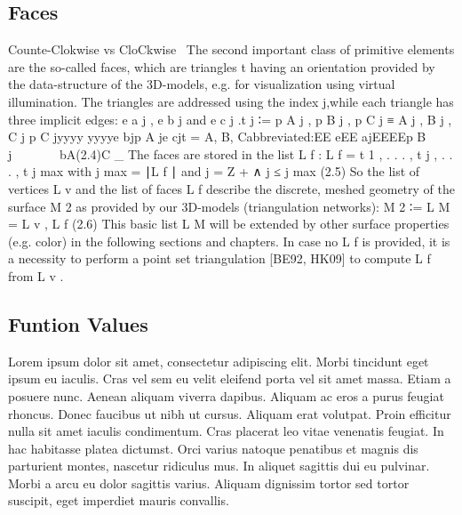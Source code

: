 \documentclass[openany]{book}
\begin{document}
\subsection{Faces}
Counte-Clokwise vs CloCkwise~\cite[p.~00]{SourceNeeded}
The second important class of primitive elements are the so-called faces, which 
are triangles t having an orientation provided by the data-structure of the 
3D-models, e.g. for visualization using virtual illumination. The triangles are 
addressed using the index j,while each triangle has three implicit edges: e a j 
, e b j and e c j .t j ∶= {p A j , p B j , p C j } ≡ {A j , B j , C j }p C jyyyy
yyyye bjp A je cjt = {A, B, C}abbreviated:EE eEE ajEEEEp B j~~~~~~ ~bA(2.4)C \_ 
The faces are stored in the list L f : L f = { t 1 , . . . , t j , . . . , t j 
max } with j max = ∣L f ∣ and j = Z + ∧ j ≤ j max
(2.5)
So the list of vertices L v and the list of faces L f describe the discrete, 
meshed geometry of the surface M 2 as provided by our 3D-models (triangulation 
networks): M 2 ∶= L M = {L v , L f } (2.6)
This basic list L M will be extended by other surface properties (e.g. color) in 
the following sections and chapters. In case no L f is provided, it is a 
necessity to perform a point set triangulation [BE92, HK09] to compute L f from 
L v .~\cite[p.~26]{Mara12}

\subsection{Funtion Values}
Lorem ipsum dolor sit amet, consectetur adipiscing elit. Morbi tincidunt eget 
ipsum eu iaculis. Cras vel sem eu velit eleifend porta vel sit amet massa. Etiam 
a posuere nunc. Aenean aliquam viverra dapibus. Aliquam ac eros a purus feugiat 
rhoncus. Donec faucibus ut nibh ut cursus. Aliquam erat volutpat. Proin efficitur 
nulla sit amet iaculis condimentum. Cras placerat leo vitae venenatis feugiat. In 
hac habitasse platea dictumst. Orci varius natoque penatibus et magnis dis 
parturient montes, nascetur ridiculus mus. In aliquet sagittis dui eu pulvinar. 
Morbi a arcu eu dolor sagittis varius. Aliquam dignissim tortor sed tortor 
suscipit, eget imperdiet mauris convallis.~\cite[p.~00]{SourceNeeded}


\end{document}
